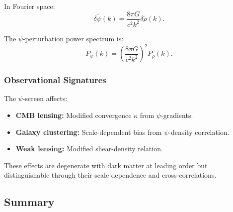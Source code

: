 In Fourier space:
\begin{equation}
\delta\tilde{\psi}(k) = \frac{8\pi G}{c^2 k^2}\delta\tilde{\rho}(k).
\end{equation}

The $\psi$-perturbation power spectrum is:
\begin{equation}
P_\psi(k) = \left(\frac{8\pi G}{c^2 k^2}\right)^2 P_\rho(k).
\end{equation}

\subsubsection{Observational Signatures}

The $\psi$-screen affects:
\begin{itemize}
\item \textbf{CMB lensing:} Modified convergence $\kappa$ from $\psi$-gradients.
\item \textbf{Galaxy clustering:} Scale-dependent bias from $\psi$-density correlation.
\item \textbf{Weak lensing:} Modified shear-density relation.
\end{itemize}

These effects are degenerate with dark matter at leading order but 
distinguishable through their scale dependence and cross-correlations.

\subsection{Summary}\label{app:extended-summary}

